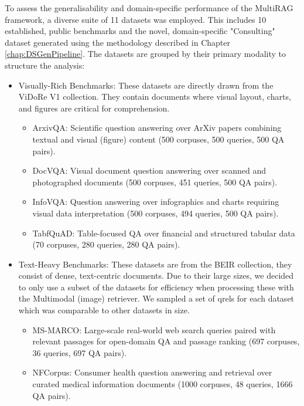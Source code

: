 \documentclass[12pt,twoside]{report}
\begin{document}
To assess the generalisability and domain-specific performance of the MultiRAG framework, a diverse suite of 11 datasets was employed. This includes 10 established, public benchmarks and the novel, domain-specific "Consulting" dataset generated using the methodology described in Chapter \ref{chap:DSGenPipeline}. The datasets are grouped by their primary modality to structure the analysis:

\begin{itemize}
\item{Visually-Rich Benchmarks}: These datasets are directly drawn from the ViDoRe V1 collection\cite{VidoreBenchmark}. They contain documents where visual layout, charts, and figures are critical for comprehension.

\begin{itemize}
\item{ArxivQA}: Scientific question answering over ArXiv papers combining textual and visual (figure) content (500 corpuses, 500 queries, 500 QA pairs).

\item{DocVQA}: Visual document question answering over scanned and photographed documents (500 corpuses, 451 queries, 500 QA pairs).

\item{InfoVQA}: Question answering over infographics and charts requiring visual data interpretation (500 corpuses, 494 queries, 500 QA pairs).

\item{TabfQuAD}: Table-focused QA over financial and structured tabular data (70 corpuses, 280 queries, 280 QA pairs).
\end{itemize}

\item{Text-Heavy Benchmarks}: These datasets are from the BEIR collection\cite{BEIR_HF}, they consist of dense, text-centric documents. Due to their large sizes, we decided to only use a subset of the datasets for efficiency when processing these with the Multimodal (image) retriever. We sampled a set of qrels for each dataset which was comparable to other datasets in size.

\begin{itemize}
\item{MS-MARCO}: Large-scale real-world web search queries paired with relevant passages for open-domain QA and passage ranking (697 corpuses, 36 queries, 697 QA pairs).

\item{NFCorpus}: Consumer health question answering and retrieval over curated medical information documents (1000 corpuses, 48 queries, 1666 QA pairs).


\end{itemize}
\end{itemize}
\end{document}
